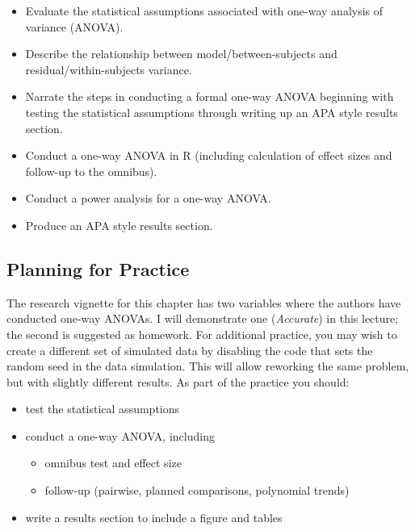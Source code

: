 \documentclass[
  english,
]{book}
\providecommand{\tightlist}{%
  \setlength{\itemsep}{0pt}\setlength{\parskip}{0pt}}
\begin{document}
\begin{itemize}
\tightlist
\item
  Evaluate the statistical assumptions associated with one-way analysis of variance (ANOVA).
\item
  Describe the relationship between model/between-subjects and residual/within-subjects variance.
\item
  Narrate the steps in conducting a formal one-way ANOVA beginning with testing the statistical assumptions through writing up an APA style results section.
\item
  Conduct a one-way ANOVA in R (including calculation of effect sizes and follow-up to the omnibus).
\item
  Conduct a power analysis for a one-way ANOVA.
\item
  Produce an APA style results section.
\end{itemize}

\hypertarget{planning-for-practice}{%
\subsection{Planning for Practice}\label{planning-for-practice}}

The research vignette for this chapter \citep{tran_you_2014} has two variables where the authors have conducted one-way ANOVAs. I will demonstrate one (\emph{Accurate}) in this lecture; the second is suggested as homework. For additional practice, you may wish to create a different set of simulated data by disabling the code that sets the random seed in the data simulation. This will allow reworking the same problem, but with slightly different results. As part of the practice you should:

\begin{itemize}
\tightlist
\item
  test the statistical assumptions
\item
  conduct a one-way ANOVA, including

  \begin{itemize}
  \tightlist
  \item
    omnibus test and effect size
  \item
    follow-up (pairwise, planned comparisons, polynomial trends)
  \end{itemize}
\item
  write a results section to include a figure and tables
\end{itemize}
\end{document}
